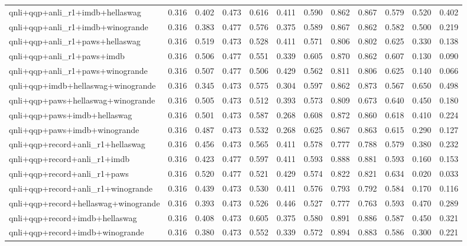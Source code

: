 \begin{table}[t]
\begin{tabular}{lrrrrrrrrrrr}
    qnli+qqp+anli\_r1+imdb+hellaswag & 0.316 & 0.402 & 0.473 & 0.616 & 0.411 & 0.590 & 0.862 & 0.867 & 0.579 & 0.520 & 0.402 \\
    qnli+qqp+anli\_r1+imdb+winogrande & 0.316 & 0.383 & 0.477 & 0.576 & 0.375 & 0.589 & 0.867 & 0.862 & 0.582 & 0.500 & 0.219 \\
    qnli+qqp+anli\_r1+paws+hellaswag & 0.316 & 0.519 & 0.473 & 0.528 & 0.411 & 0.571 & 0.806 & 0.802 & 0.625 & 0.330 & 0.138 \\
    qnli+qqp+anli\_r1+paws+imdb & 0.316 & 0.506 & 0.477 & 0.551 & 0.339 & 0.605 & 0.870 & 0.862 & 0.607 & 0.130 & 0.090 \\
    qnli+qqp+anli\_r1+paws+winogrande & 0.316 & 0.507 & 0.477 & 0.506 & 0.429 & 0.562 & 0.811 & 0.806 & 0.625 & 0.140 & 0.066 \\
    qnli+qqp+imdb+hellaswag+winogrande & 0.316 & 0.345 & 0.473 & 0.575 & 0.304 & 0.597 & 0.862 & 0.873 & 0.567 & 0.650 & 0.498 \\
    qnli+qqp+paws+hellaswag+winogrande & 0.316 & 0.505 & 0.473 & 0.512 & 0.393 & 0.573 & 0.809 & 0.673 & 0.640 & 0.450 & 0.180 \\
    qnli+qqp+paws+imdb+hellaswag & 0.316 & 0.501 & 0.473 & 0.587 & 0.268 & 0.608 & 0.872 & 0.860 & 0.618 & 0.410 & 0.224 \\
    qnli+qqp+paws+imdb+winogrande & 0.316 & 0.487 & 0.473 & 0.532 & 0.268 & 0.625 & 0.867 & 0.863 & 0.615 & 0.290 & 0.127 \\
    qnli+qqp+record+anli\_r1+hellaswag & 0.316 & 0.456 & 0.473 & 0.565 & 0.411 & 0.578 & 0.777 & 0.788 & 0.579 & 0.380 & 0.232 \\
    qnli+qqp+record+anli\_r1+imdb & 0.316 & 0.423 & 0.477 & 0.597 & 0.411 & 0.593 & 0.888 & 0.881 & 0.593 & 0.160 & 0.153 \\
    qnli+qqp+record+anli\_r1+paws & 0.316 & 0.520 & 0.477 & 0.521 & 0.429 & 0.574 & 0.822 & 0.821 & 0.634 & 0.020 & 0.033 \\
    qnli+qqp+record+anli\_r1+winogrande & 0.316 & 0.439 & 0.473 & 0.530 & 0.411 & 0.576 & 0.793 & 0.792 & 0.584 & 0.170 & 0.116 \\
    qnli+qqp+record+hellaswag+winogrande & 0.316 & 0.393 & 0.473 & 0.526 & 0.446 & 0.527 & 0.777 & 0.763 & 0.593 & 0.470 & 0.289 \\
    qnli+qqp+record+imdb+hellaswag & 0.316 & 0.408 & 0.473 & 0.605 & 0.375 & 0.580 & 0.891 & 0.886 & 0.587 & 0.450 & 0.321 \\
    qnli+qqp+record+imdb+winogrande & 0.316 & 0.380 & 0.473 & 0.552 & 0.339 & 0.572 & 0.894 & 0.883 & 0.586 & 0.300 & 0.221 \\

\end{tabular}
\end{table}
